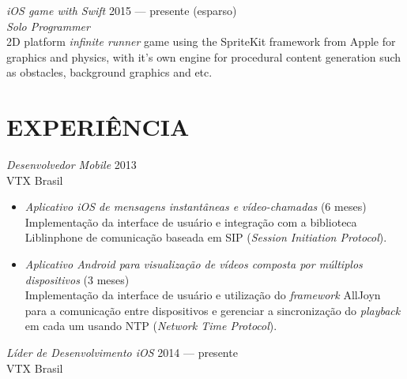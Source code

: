 \documentclass[]{res} %
\newcommand{\sbt}{\,\begin{picture}(-1,1)(-2,-3)\circle*{2}\end{picture}\ }
\def \divspace{6pt}
\def \myitemback{0.55cm}
\def \myitemsep{0pt}
\def \mypositionface{\sl}
\def \myprojectface{\it}
\def \myorgface{\sc}
\newif\ifport
\begin{document}
\begin{resume}
    {\myprojectface iOS game with Swift} \hfill 2015 — presente (esparso) \\
    {\mypositionface Solo Programmer} \\
    2D platform {\it infinite runner} game using the SpriteKit framework from Apple for graphics and physics, with it's own engine for procedural content generation such as obstacles, background graphics and etc.
\fi
\ifport
    \section{EXPERIÊNCIA \hspace{\divspace} }

    {\mypositionface Desenvolvedor Mobile} \hfill 2013 \\
    {\myorgface VTX Brasil}

    \begin{itemize}[itemsep=\myitemsep,leftmargin=\myitemback]
    \item[\sbt] {\it Aplicativo iOS de mensagens instantâneas e vídeo-chamadas} \hfill (6 meses)\\
    Implementação da interface de usuário e integração com a biblioteca Liblinphone de comunicação baseada em SIP ({\it Session Initiation Protocol}).
    \item[\sbt] {\it Aplicativo Android para visualização de vídeos composta por múltiplos dispositivos} \hfill (3 meses)\\
    Implementação da interface de usuário e utilização do {\it framework} AllJoyn para a comunicação entre dispositivos e gerenciar a sincronização do {\it playback} em cada um usando NTP ({\it Network Time Protocol}).
    \end{itemize}

    {\mypositionface Líder de Desenvolvimento iOS} \hfill 2014 — presente\\
    {\myorgface VTX Brasil}


\end{resume}
\end{document}
